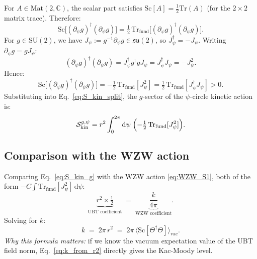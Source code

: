 \documentclass[11pt,a4paper]{article}
\theoremstyle{definition}
\theoremstyle{remark}
\begin{document}
For $A \in \mathrm{Mat}(2,\mathbb{C})$, the scalar part satisfies
$\mathrm{Sc}[A] = \tfrac{1}{2}\mathrm{Tr}(A)$ (for the $2\times 2$ matrix trace).
Therefore:
\begin{equation}
  \mathrm{Sc}\bigl[(\partial_\psi g)^\dagger(\partial_\psi g)\bigr]
  = \tfrac{1}{2}\,\mathrm{Tr}_{\mathrm{fund}}\bigl[(\partial_\psi g)^\dagger(\partial_\psi g)\bigr].
  \label{eq:Sc_Tr}
\end{equation}
For $g \in \mathrm{SU}(2)$, we have $J_\psi := g^{-1}\partial_\psi g \in \mathfrak{su}(2)$,
so $J_\psi^\dagger = -J_\psi$.
Writing $\partial_\psi g = g J_\psi$:
\begin{equation}
  (\partial_\psi g)^\dagger(\partial_\psi g)
  = J_\psi^\dagger g^\dagger g J_\psi
  = J_\psi^\dagger J_\psi = -J_\psi^2.
  \label{eq:dg_sq}
\end{equation}
Hence:
\begin{equation}
  \mathrm{Sc}\bigl[(\partial_\psi g)^\dagger(\partial_\psi g)\bigr]
  = -\tfrac{1}{2}\,\mathrm{Tr}_{\mathrm{fund}}[J_\psi^2]
  = \tfrac{1}{2}\,\mathrm{Tr}_{\mathrm{fund}}[J_\psi^\dagger J_\psi]
  > 0.
  \label{eq:Sc_positive}
\end{equation}
Substituting into Eq.~\eqref{eq:S_kin_split}, the $g$-sector of the
$\psi$-circle kinetic action is:
\begin{equation}
  \mathcal{S}_{\mathrm{kin}}^{g,\psi}
  = r^2 \int_0^{2\pi} \mathrm{d}\psi\;
    \Bigl(-\tfrac{1}{2}\,\mathrm{Tr}_{\mathrm{fund}}[J_\psi^2]\Bigr).
  \label{eq:S_kin_g}
\end{equation}

\subsection{Comparison with the WZW action}

Comparing Eq.~\eqref{eq:S_kin_g} with the WZW action
\eqref{eq:WZW_S1}, both of the form $-C \int \mathrm{Tr}_{\mathrm{fund}}[J_\psi^2]\,\mathrm{d}\psi$:
\begin{equation}
  \underbrace{r^2 \times \tfrac{1}{2}}_{\text{UBT coefficient}}
  \;=\;
  \underbrace{\frac{k}{4\pi}}_{\text{WZW coefficient}}.
  \label{eq:coefficient_match}
\end{equation}
Solving for $k$:
\begin{equation}
  \boxed{k \;=\; 2\pi\,r^2 \;=\; 2\pi\,\langle\mathrm{Sc}[\Theta^\dagger\Theta]\rangle_{\mathrm{vac}}.}
  \label{eq:k_from_r2}
\end{equation}
\textit{Why this formula matters:} if we know the vacuum expectation value of
the UBT field norm, Eq.~\eqref{eq:k_from_r2} directly gives the
Kac-Moody level.
\end{document}
